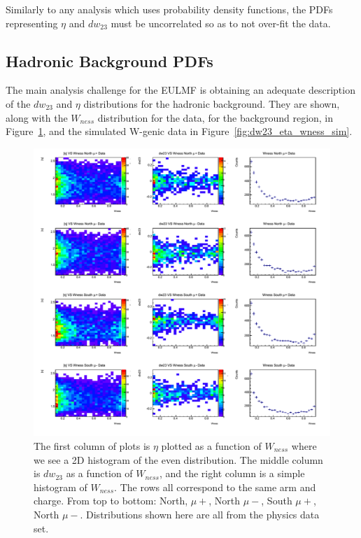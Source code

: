 Similarly to any analysis which uses probability density functions, the PDFs
representing $\eta$ and $dw_{23}$ must be uncorrelated so as to not over-fit
the data.


\subsection{Hadronic Background PDFs}

The main analysis challenge for the EULMF is obtaining an adequate description
of the $dw_{23}$ and $\eta$ distributions for the hadronic background. They are
shown, along with the $W_{ness}$ distribution for the data, for the background
region, in Figure~\ref{fig:dw23_eta_wness_dat}, and the simulated W-genic data
in Figure~\ref{fig:dw23_eta_wness_sim}.

\begin{figure}
  \centering
  \includegraphics[width=\linewidth]{./figures/dw23_vs_wness_data.png}
  \caption{
    The first column of plots is $\eta$ plotted as a function of $W_{ness}$
    where we see a 2D histogram of the even distribution. The middle column is
    $dw_{23}$ as a function of $W_{ness}$, and the right column is a simple
    histogram of $W_{ness}$. The rows all correspond to the same arm and charge.
    From top to bottom: North, $\mu+$, North $\mu-$, South $\mu+$, North $\mu-$.
    Distributions shown here are all from the physics data set.
  }
  \label{fig:dw23_eta_wness_dat}
\end{figure}


